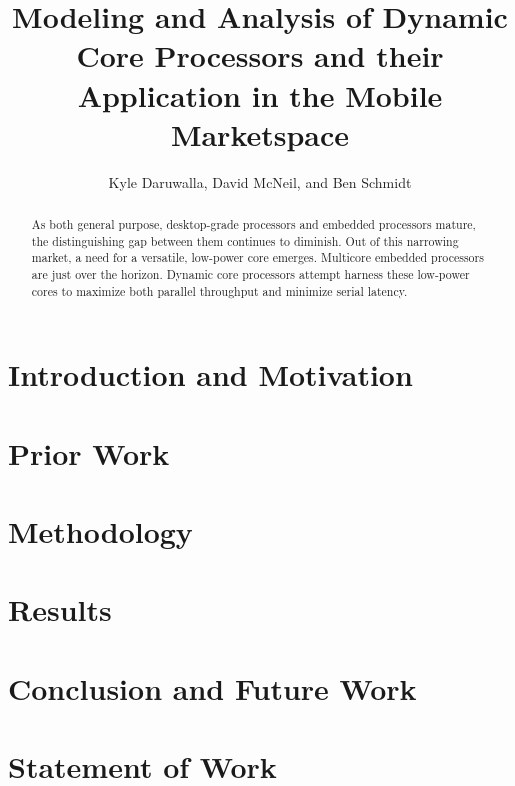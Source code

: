 \documentclass[journal]{IEEEtran}
\begin{document}
\title{Modeling and Analysis of Dynamic Core Processors and their Application in the Mobile Marketspace}

\author{Kyle Daruwalla, David McNeil, and Ben Schmidt \\ }%


\maketitle

\begin{abstract}
As both general purpose, desktop-grade processors and embedded processors mature, the distinguishing gap between them continues to diminish. Out of this narrowing market, a need for a versatile, low-power core emerges. Multicore embedded processors are just over the horizon. Dynamic core processors attempt harness these low-power cores to maximize both parallel throughput and minimize serial latency.
\end{abstract}

\section{Introduction and Motivation}


\section{Prior Work}


\section{Methodology}


\section{Results}


\section{Conclusion and Future Work}


\section{Statement of Work}

\end{document}

